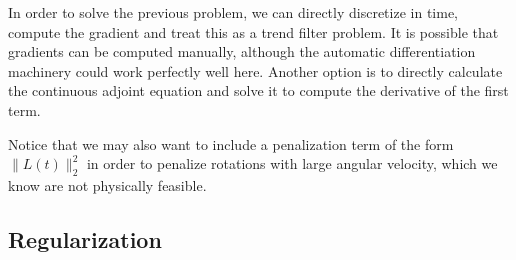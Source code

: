 In order to solve the previous problem, we can directly discretize in time, compute the gradient and treat this as a trend filter problem. It is possible that gradients can be computed manually, although the automatic differentiation machinery could work perfectly well here.
Another option is to directly calculate the continuous adjoint equation and solve it to compute the derivative of the first term. 

Notice that we may also want to include a penalization term of the form $\| L(t) \|_2^2$ in order to penalize rotations with large angular velocity, which we know are not physically feasible. 


\subsection{Regularization}

